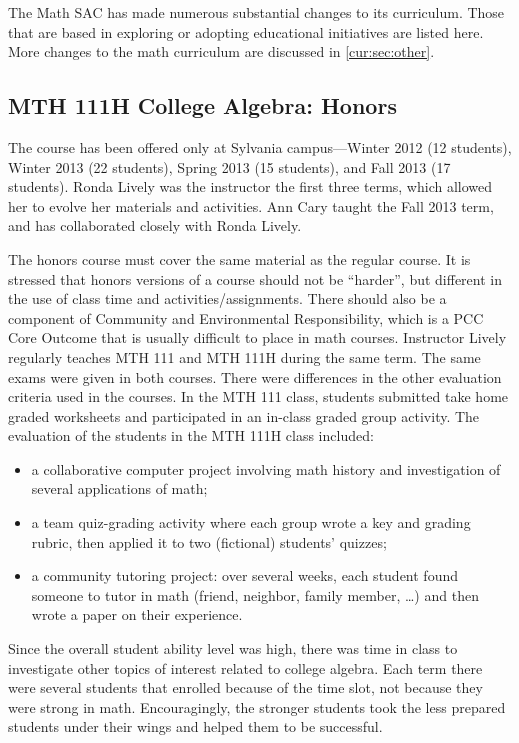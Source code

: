The Math SAC has made numerous substantial changes to its curriculum.
Those that are based in exploring or adopting educational initiatives are listed here.
More changes to the math curriculum are discussed in \vref{cur:sec:other}.

\subsection{MTH 111H College Algebra: Honors}\label{cur:sub:111H}

The course has been offered only at Sylvania campus---Winter 2012 (12 students), Winter 2013 (22 students), Spring 2013 (15 students), and Fall 2013 (17 students).
Ronda Lively was the instructor the first three terms, which allowed her to evolve her materials and activities.
Ann Cary taught the Fall 2013 term, and has collaborated closely with Ronda Lively.

The honors course must cover the same material as the regular course.
It is stressed that honors versions of a course should not be ``harder'', but different in the use of class time and activities/assignments.
There should also be a component of Community and Environmental Responsibility, which is a PCC Core Outcome that is usually difficult to place in math courses.
Instructor Lively regularly teaches MTH 111 and MTH 111H during the same term.
The same exams were given in both courses.
There were differences in the other evaluation criteria used in the courses.
In the MTH 111 class, students submitted take home graded worksheets and participated in an in-class graded group activity.
The evaluation of the students in the MTH 111H class included:
\begin{itemize}
	\item a collaborative computer project involving math history and investigation of several applications of math;
	\item a team quiz-grading activity where each group wrote a key and grading rubric, then applied it to two (fictional) students' quizzes;
	\item a community tutoring project:  over several weeks, each student found someone to tutor in math (friend, neighbor, family member, \ldots) and then wrote a paper on their experience.
\end{itemize}
Since the overall student ability level was high, there was time in class to investigate other topics of interest related to college algebra.
Each term there were several students that enrolled because of the time slot, not because they were strong in math.
Encouragingly, the stronger students took the less prepared students under their wings and helped them to be successful.

